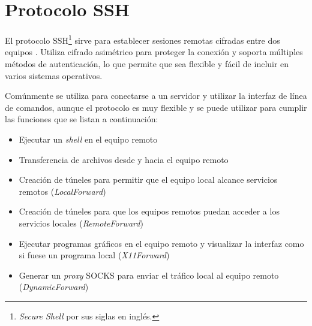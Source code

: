 \newpage
\section {Protocolo \textsc{SSH}}
\label{Protocolo-SSH}
El protocolo \textsc{SSH}\footnote{\textit{Secure Shell} por sus siglas en ingl\'{e}s.} sirve para establecer sesiones remotas cifradas entre dos equipos \cite{_ssh_????-1}. Utiliza cifrado asim\'{e}trico para proteger la conexi\'{o}n y soporta m\'{u}ltiples m\'{e}todos de autenticaci\'{o}n, lo que permite que sea flexible y f\'{a}cil de incluir en varios sistemas operativos.

Com\'{u}nmente se utiliza para conectarse a un servidor y utilizar la interfaz de l\'{i}nea de comandos, aunque el protocolo es muy flexible y se puede utilizar para cumplir las funciones que se listan a continuaci\'{o}n:

  \begin{itemize}
    \item Ejecutar un \textit{shell} en el equipo remoto
    \item Transferencia de archivos desde y hacia el equipo remoto
    \item Creaci\'{o}n de t\'{u}neles para permitir que el equipo local alcance servicios remotos (\textit{LocalForward})
    \item Creaci\'{o}n de t\'{u}neles para que los equipos remotos puedan acceder a los servicios locales (\textit{RemoteForward})
    \item Ejecutar programas gr\'{a}ficos en el equipo remoto y visualizar la interfaz como si fuese un programa local (\textit{X11Forward})
    \item Generar un \textit{proxy} \textsc{SOCKS} para enviar el tr\'{a}fico local al equipo remoto (\textit{DynamicForward})
  \end{itemize}


